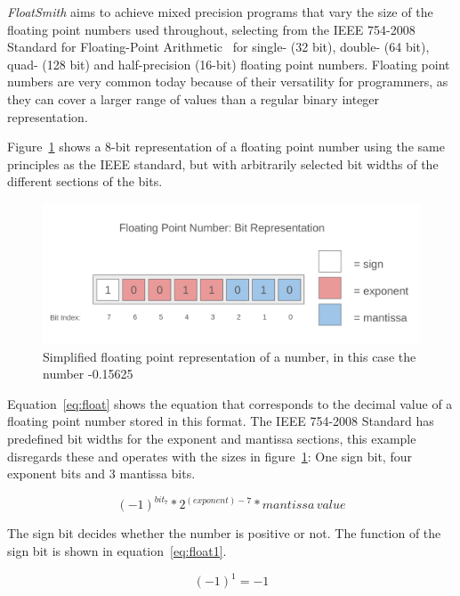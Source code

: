 \emph{FloatSmith} aims to achieve mixed precision programs that vary the size of the floating point numbers used throughout, selecting from the IEEE 754-2008 Standard for Floating-Point Arithmetic~\citep{ieee754} for single- (32 bit), double- (64 bit), quad- (128 bit) and half-precision (16-bit) floating point numbers. Floating point numbers are very common today because of their versatility for programmers, as they can cover a larger range of values than a regular binary integer representation.

Figure~\ref{fig:float_bit_representation} shows a 8-bit representation of a floating point number using the same principles as the IEEE standard, but with arbitrarily selected bit widths of the different sections of the bits. 

\begin{figure}[h]
    \centering
    \includegraphics[width=0.75\linewidth]{Images/float_bit_representation.png}
    \caption{Simplified floating point representation of a number, in this case the number -0.15625}
    \label{fig:float_bit_representation}
\end{figure}

Equation~\ref{eq:float} shows the equation that corresponds to the decimal value of a floating point number stored in this format. The IEEE 754-2008 Standard has predefined bit widths for the exponent and mantissa sections, this example disregards these and operates with the sizes in figure~\ref{fig:float_bit_representation}: One sign bit, four exponent bits and 3 mantissa bits.

\begin{equation}\label{eq:float}
    (-1)^{bit_7} * 2^{(exponent) - 7} * mantissa \, value
\end{equation}

The sign bit decides whether the number is positive or not. The function of the sign bit is shown in equation~\ref{eq:float1}.

\begin{equation} \label{eq:float1}
    (-1)^{1} = -1
\end{equation}

